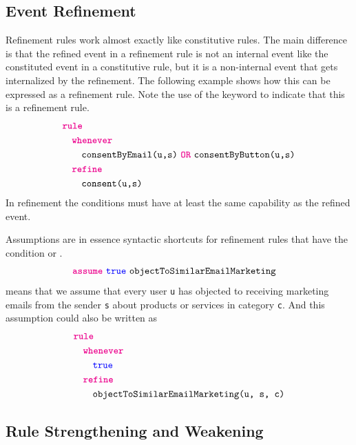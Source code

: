 \subsection{Event Refinement}
\label{subsection:lex-event-refinement}
    Refinement rules work almost exactly like constitutive rules.
    The main difference is that the refined event
    in a refinement rule is not an internal event like
    the constituted event in a constitutive rule,
    but it is a non-internal event that gets internalized
    by the refinement.
    The following example shows how this can be expressed as a
    refinement rule.
    Note the use of the  keyword
    to indicate that this is a refinement rule.
    \begin{align*}
        &{\color{magenta}\texttt{\bfseries\upshape rule}} \\
        &\quad {\color{magenta}\texttt{\bfseries\upshape whenever}} \\
        &\qquad \texttt{consentByEmail(u,s)}~{\color{magenta}\texttt{\bfseries\upshape OR}}~\texttt{consentByButton(u,s)} \\            
        &\quad {\color{magenta}\texttt{\bfseries\upshape refine}} \\
        &\qquad \texttt{consent(u,s)}
    \end{align*}
    In refinement the conditions must have at least
    the same capability as the refined event.

    Assumptions are in essence syntactic shortcuts for 
    refinement rules that have the condition 
    or .
    \begin{align*}
        &{\color{magenta}\texttt{\bfseries\upshape assume}}~{\color{blue}\texttt{\upshape true}}~\texttt{objectToSimilarEmailMarketing}
    \end{align*}
    means that we assume that every user \texttt{u} has objected
    to receiving marketing emails
    from the sender \texttt{s} about products or services in
    category \texttt{c}.
    And this assumption could also be
    written as
    \begin{align*}
        &{\color{magenta}\texttt{\bfseries\upshape rule}} \\
        &\quad {\color{magenta}\texttt{\bfseries\upshape whenever}} \\
        &\qquad {\color{blue}\texttt{\upshape true}} \\
        &\quad {\color{magenta}\texttt{\bfseries\upshape refine}} \\ 
        &\qquad \texttt{objectToSimilarEmailMarketing(u, s, c)}
    \end{align*}

\subsection{Rule Strengthening and Weakening}
\label{subsection:lex-rule-strengthening-and-weakening}

